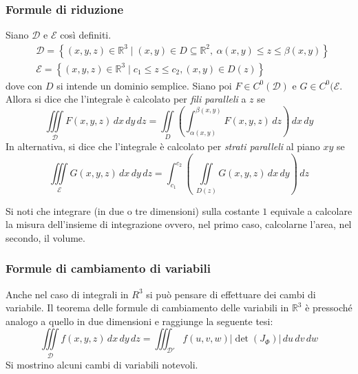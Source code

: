 \subsubsection{Formule di riduzione}
Siano $\mathcal{D}$ e $\mathcal{E}$ così definiti.
\begin{align}
    &\mathcal{D}=\left\{(x,y,z) \in \mathbb{R}^3 \mid (x,y) \in D \subseteq \mathbb{R}^2,\ \alpha(x, y)\leq z \leq \beta(x,y) \right\}\\
    &\mathcal{E}= \left\{(x,y,z) \in \mathbb{R}^3 \mid c_1\leq z \leq c_2, (x,y) \in D(z)\right\}
\end{align}
dove con $D$ si intende un dominio semplice. Siano poi $F \in C^0(\mathcal{D})$ e $G \in C^0(\mathcal{E}$.
Allora si dice che l'integrale è calcolato per \textit{fili paralleli} a $z$ se
\begin{equation*}
    \iiint\limits_{\mathcal{D}} F(x,y,z)\, dx\, dy\,dz= \iint\limits_{D}{\left(\int_{\alpha(x,y)}^{\beta(x,y)}{F(x,y,z)\, dz}\right)}\,dx\, dy
\end{equation*}
In alternativa, si dice che l'integrale è calcolato per \textit{strati paralleli} al piano $xy$ se
\begin{equation*}
\iiint\limits_{\mathcal{E}}{G(x,y,z)\, dx\,dy\,dz} = \int_{c_1}^{c_2}{\left(\ \iint\limits_{D(z)}{G(x,y,z) \, dx\,dy} \right)\, dz}
\end{equation*}
\begin{oss}    
Si noti che integrare (in due o tre dimensioni) sulla costante $1$ equivale a calcolare la misura dell'insieme di integrazione ovvero, nel primo caso, calcolarne l'area, nel secondo, il volume.
\end{oss}
\subsubsection{Formule di cambiamento di variabili}
Anche nel caso di integrali in $R^3$ si può pensare di effettuare dei cambi di variabile. Il teorema delle formule di cambiamento delle variabili in $\mathbb{R}^3$ è pressoché analogo a quello in due dimensioni e raggiunge la seguente tesi:
\begin{equation*}
    \iiint\limits_{\mathcal{D}}{f(x,y,z)}\,dx\,dy\,dz=\iiint_{\mathcal{D}'}{f(u,v,w)|\det(J_\Phi)|}\,du\,dv\,dw
\end{equation*}
Si mostrino alcuni cambi di variabili notevoli.

